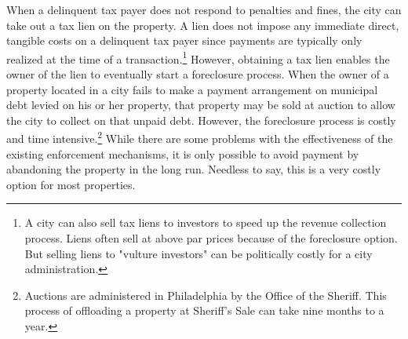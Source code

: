 \documentclass[12pt]{article}
\begin{document}
When a delinquent tax payer does not respond to penalties and fines,
the city can take out a tax lien on the property.  A lien does not
impose any immediate direct, tangible costs on a delinquent tax payer
since payments are typically only realized at the time of a
transaction.\footnote{A city can also sell tax liens to investors to
  speed up the revenue collection process. Liens often sell at above
  par prices because of the foreclosure option. But selling liens to
  "vulture investors" can be politically costly for a city
  administration.}  However, obtaining a tax lien enables the owner of
the lien to eventually start a foreclosure process. When the owner of
a property located in a city fails to make a payment arrangement on
municipal debt levied on his or her property, that property may be
sold at auction to allow the city to collect on that unpaid debt.
However, the foreclosure process is costly and time
intensive.\footnote{Auctions are administered in Philadelphia by the
  Office of the Sheriff.  This process of offloading a property at
  Sheriff's Sale can take nine months to a year.}  While there are
some problems with the effectiveness of the existing enforcement
mechanisms, it is only possible to avoid payment by abandoning the
property in the long run. Needless to say, this is a very costly
option for most properties.
\end{document}
